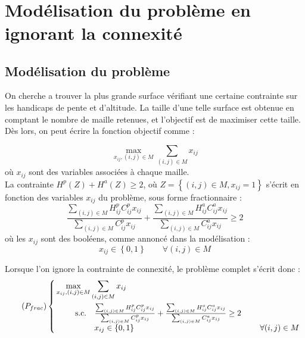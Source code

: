 \documentclass[a4paper,11pt]{article}
\begin{document}
~\\
\newpage
\section{Modélisation du problème en ignorant la connexité}


\subsection{Modélisation du problème}

On cherche a trouver la plus grande surface vérifiant une certaine contrainte sur les handicaps de pente et d'altitude. La taille d'une telle surface est obtenue en comptant le nombre de maille retenues, et l'objectif est de maximiser cette taille. Dès lors, on peut écrire la fonction objectif comme :

\begin{equation}
\max_{x_{ij}, (i,j) \in M} \sum_{(i,j) \in M} x_{ij}
\end{equation}
où $x_{ij}$ sont des variables associées à chaque maille.\\


La contrainte $H^p(Z) + H^a(Z) \ge 2$, où $Z = \left\{ (i,j) \in M, x_{ij} = 1 \right\}$ s'écrit en fonction des variables $x_{ij}$ du problème, sous forme fractionnaire :
\begin{equation}
\frac{\sum_{(i,j)\in M} H^p_{ij} C^p_{ij} x_{ij}}{\sum_{(i,j)\in M} C^p_{ij} x_{ij}} + \frac{\sum_{(i,j)\in M} H^a_{ij} C^a_{ij} x_{ij}}{\sum_{(i,j)\in M} C^a_{ij} x_{ij}} \ge 2
\label{eq:contr_frac}
\end{equation}
où les $x_{ij}$ sont des booléens, comme annoncé dans la modélisation :
\begin{equation}
x_{ij} \in \left\{0,1 \right\} \qquad \forall (i,j) \in M
\end{equation}



Lorsque l'on ignore la contrainte de connexité, le problème complet s'écrit donc :
\begin{equation}\tag{$P_{frac}$}
\left\{ \begin{aligned}
& \max_{x_{ij}, (i,j) \in M} \sum_{(i,j) \in M} x_{ij} \\
& \qquad \begin{array}{cll}
\text{s.c.} & \frac{\sum_{(i,j)\in M} H^p_{ij} C^p_{ij} x_{ij}}{\sum_{(i,j)\in M} C^p_{ij} x_{ij}} + \frac{\sum_{(i,j)\in M} H^a_{ij} C^a_{ij} x_{ij}}{\sum_{(i,j)\in M} C^a_{ij} x_{ij}} \ge 2 & ~ \\
~ & x_{ij} \in \left\{0,1 \right\} &  ~~~~ \forall (i,j) \in M
\end{array} 
\end{aligned} \right.
\end{equation}
\end{document}
